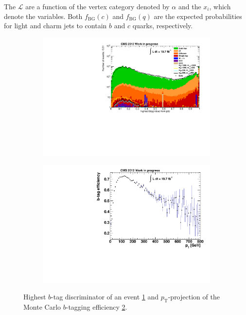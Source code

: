 \noindent The $\mathcal{L}$ are a function of the vertex category denoted by $\alpha$ and the $x_i$, which denote the variables. Both $f_{\text{BG}}(c)$ and $f_{\text{BG}}(q)$ are the expected probabilities for light and charm jets to contain $b$ and $c$ quarks, respectively.

\begin{figure}[htb!]
  \centering
  \begin{subfigure}[b]{0.495\textwidth}
    \centering
    \includegraphics[width=\textwidth]{plots/1st_btag.pdf}
    \caption{\label{fig:1st_btag}}
  \end{subfigure}
  \begin{subfigure}[b]{0.495\textwidth}
    \centering
    \includegraphics[width=\textwidth]{plots/b_proj.pdf}
    \caption{\label{fig:b_proj}}
  \end{subfigure}
  \caption{Highest $b$-tag discriminator of an event \ref{fig:1st_btag} and $p_{\text{T}}$-projection of the Monte Carlo $b$-tagging efficiency \ref{fig:b_proj}.}
  \label{fig:dyscaling}
\end{figure}

